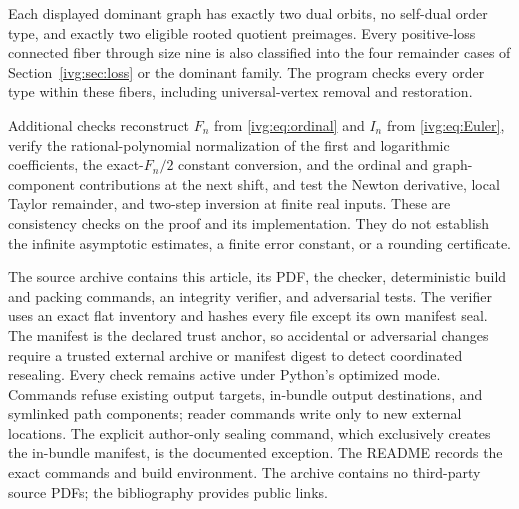 \documentclass[11pt,letterpaper]{article}
\theoremstyle{definition}\newtheorem{definition}[theorem]{Definition}
\theoremstyle{remark}\newtheorem{remark}[theorem]{Remark}
\begin{document}
Each displayed dominant graph has exactly two dual orbits, no self-dual order type, and exactly two eligible rooted quotient preimages. Every positive-loss connected fiber through size nine is also classified into the four remainder cases of Section~\ref{ivg:sec:loss} or the dominant family. The program checks every order type within these fibers, including universal-vertex removal and restoration.

Additional checks reconstruct $F_n$ from \eqref{ivg:eq:ordinal} and $I_n$ from \eqref{ivg:eq:Euler}, verify the rational-polynomial normalization of the first and logarithmic coefficients, the exact-$F_n/2$ constant conversion, and the ordinal and graph-component contributions at the next shift, and test the Newton derivative, local Taylor remainder, and two-step inversion at finite real inputs. These are consistency checks on the proof and its implementation. They do not establish the infinite asymptotic estimates, a finite error constant, or a rounding certificate.

The source archive contains this article, its PDF, the checker, deterministic build and packing commands, an integrity verifier, and adversarial tests. The verifier uses an exact flat inventory and hashes every file except its own manifest seal. The manifest is the declared trust anchor, so accidental or adversarial changes require a trusted external archive or manifest digest to detect coordinated resealing. Every check remains active under Python's optimized mode. Commands refuse existing output targets, in-bundle output destinations, and symlinked path components; reader commands write only to new external locations. The explicit author-only sealing command, which exclusively creates the in-bundle manifest, is the documented exception. The README records the exact commands and build environment. The archive contains no third-party source PDFs; the bibliography provides public links.
\end{document}
